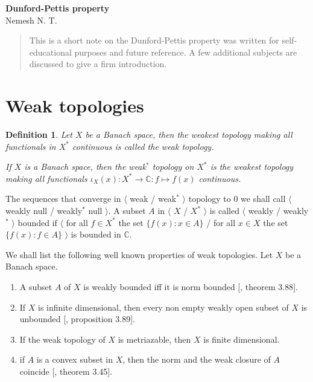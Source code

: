 \documentclass[12pt]{article}
\newtheorem{definition}[theorem]{Definition}
\begin{document}
\begin{center}

    \Large \textbf{Dunford-Pettis property}\\[0.5cm]
    \small {Nemesh N. T.}\\[0.5cm]

\end{center}

\begin{abstract}
    This is a short note on the Dunford-Pettis property was written for
    self-educational purposes and future reference. A few additional subjects
    are discussed to give a firm introduction.
\end{abstract}

\section{Weak topologies}

\begin{definition} Let $X$ be a Banach space, then the weakest topology making
    all functionals in $X^*$ continuous is called the weak topology.

    If $X$ is a Banach space, then the weak${}^*$ topology on $X^*$ is the
    weakest topology making all functionals
    $\iota_X(x):X^*\to\mathbb{C}:f\mapsto f(x)$ continuous.
\end{definition}

The sequences that converge in $\langle$ weak / weak${}^*$ $\rangle$ topology to
$0$ we shall call $\langle$ weakly null / weakly${}^*$ null $\rangle$. A subset
$A$ in $\langle$ $X$ / $X^*$ $\rangle$ is called $\langle$ weakly / weakly${}^*$
$\rangle$ bounded if $\langle$ for all $f\in X^*$ the set $\{f(x):x\in A\}$ /
for all $x\in X$ the set $\{f(x):f\in A\}$ $\rangle$ is bounded in $\mathbb{C}$.

We shall list the following well known properties of weak topologies. Let $X$ be
a Banach space.

\begin{enumerate}[label = (\roman*)]

    \item A subset $A$ of $X$ is weakly bounded iff it is norm bounded
              [\cite{FabHabBanSpTh}, theorem 3.88].

    \item If $X$ is infinite dimensional, then every non empty weakly open
          subset of $X$ is unbounded [\cite{FabHabBanSpTh}, proposition 3.89].

    \item If the weak topology of $X$ is metriazable, then $X$ is finite
          dimensional.

    \item if $A$ is a convex subset in $X$, then the norm and the weak closure
          of $A$ coincide [\cite{FabHabBanSpTh}, theorem 3.45].

\end{enumerate}
\end{document}
